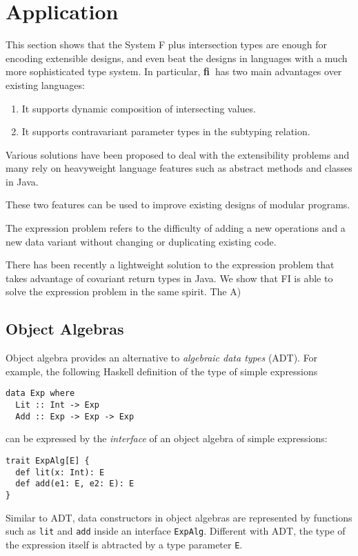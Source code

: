 \documentclass[preprint]{sigplanconf}
\newcommand{\systemfi}{{\bf fi~}}
\begin{document}
\section{Application}




This section shows that the System F plus intersection types are enough for
encoding extensible designs, and even beat the designs in languages with a much
more sophisticated type system. In particular, \systemfi has two main advantages
over existing languages:

\begin{enumerate}
\item It supports dynamic composition of intersecting values.
\item It supports contravariant parameter types in the subtyping relation.
\end{enumerate}

Various solutions have been proposed to deal with the extensibility problems and
many rely on heavyweight language features such as abstract methods and classes
in Java.

These two features can be used to improve existing designs of modular programs.


The expression problem refers to the difficulty of adding a new operations and a
new data variant without changing or duplicating existing code.

There has been recently a lightweight solution to the expression problem that
takes advantage of covariant return types in Java. We show that FI is able to
solve the expression problem in the same spirit. The
A)

\subsection{Object Algebras}

Object algebra provides an alternative to \emph{algebraic data types} (ADT). For example, the
following Haskell definition of the type of simple expressions
\begin{verbatim}
data Exp where
  Lit :: Int -> Exp
  Add :: Exp -> Exp -> Exp
\end{verbatim}
can be expressed by the \emph{interface} of an object algebra of simple expressions:
\begin{verbatim}
trait ExpAlg[E] {
  def lit(x: Int): E
  def add(e1: E, e2: E): E
}
\end{verbatim}
Similar to ADT, data constructors in object algebras are represented by functions such as
\lstinline{lit} and \lstinline{add} inside an interface \lstinline{ExpAlg}.
Different with ADT, the type of the expression itself is abtracted by a type
parameter \lstinline{E}.
\end{document}
